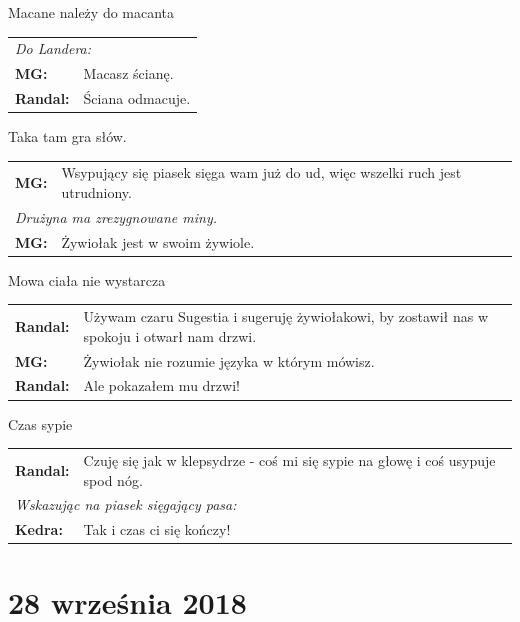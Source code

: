 \documentclass[10pt,twoside,twocolumn]{book}
\begin{document}
\begin{rpg-quotebox}{Macane należy do macanta}
   \begin{tabularx}{\columnwidth}{lX}
      \multicolumn{2}{l}{\textit{Do Landera:}}\\
      \textbf{MG:} & Macasz ścianę.\\
      \textbf{Randal:} & Ściana odmacuje.\\
   \end{tabularx}
\end{rpg-quotebox}


\begin{rpg-quotebox}{Taka tam gra słów.}
   \begin{tabularx}{\columnwidth}{lX}
      \textbf{MG:} & Wsypujący się piasek sięga wam już do ud, więc wszelki ruch jest utrudniony.\\
      \multicolumn{2}{l}{\textit{Drużyna ma zrezygnowane miny.}}\\
      \textbf{MG:} & Żywiołak jest w swoim żywiole.\\
   \end{tabularx}
\end{rpg-quotebox}


\begin{rpg-quotebox}{Mowa ciała nie wystarcza}
   \begin{tabularx}{\columnwidth}{lX}
      \textbf{Randal:} & Używam czaru Sugestia i sugeruję żywiołakowi, by zostawił nas w spokoju i otwarł nam drzwi.\\
      \textbf{MG:} & Żywiołak nie rozumie języka w którym mówisz.\\
      \textbf{Randal:} & Ale pokazałem mu drzwi!\\
   \end{tabularx}
\end{rpg-quotebox}


\begin{rpg-quotebox}{Czas sypie}
   \begin{tabularx}{\columnwidth}{lX}
      \textbf{Randal:} & Czuję się jak w klepsydrze - coś mi się sypie na głowę i coś usypuje spod nóg.\\
      \multicolumn{2}{l}{\textit{Wskazując na piasek sięgający pasa:}}\\
      \textbf{Kedra:} & Tak i czas ci się kończy!\\
   \end{tabularx}
\end{rpg-quotebox}


\section*{28 września 2018}
\end{document}
